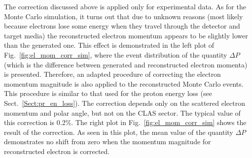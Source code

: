 The correction discussed above is applied only for experimental data. As for the Monte Carlo simulation, it turns out that due to unknown reasons (most likely because electrons lose some energy when they travel through the detector and target media) the reconstructed electron momentum appears to be slightly lower than the generated one. This effect is demonstrated in the left plot of Fig.~\ref{fig:el_mom_corr_sim}, where the event distribution of the quantity $\Delta P$ (which is the difference between generated and reconstructed electron momenta) is presented. Therefore, an adapted procedure of correcting the electron momentum magnitude is also applied to the reconstructed Monte Carlo events. This procedure is similar to that used for the proton energy loss (see Sect.~\ref{Sect:pr_en_loss}). The correction depends only on the scattered electron momentum and polar angle, but not on the CLAS sector. The typical value of this correction is 0.2\%. The right plot in Fig.~\ref{fig:el_mom_corr_sim} shows the result of the correction. As seen in this plot, the mean value of the quantity $\Delta P$ demonstrates no shift from zero when the momentum magnitude for reconstructed electron is corrected. 



